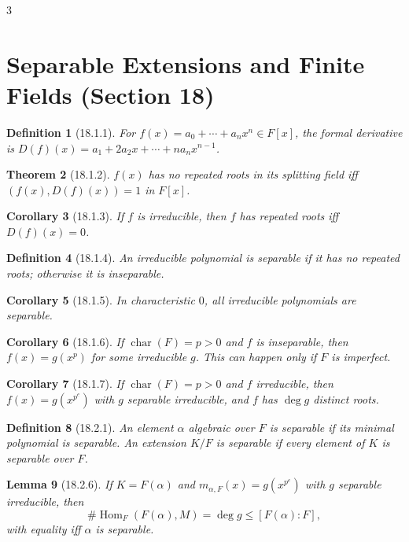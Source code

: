 \documentclass[10pt,landscape]{article}
\newtheorem{theorem}{Theorem}[section]
\newtheorem{definition}[theorem]{Definition}
\newtheorem{lemma}[theorem]{Lemma}
\newtheorem{corollary}[theorem]{Corollary}
\begin{document}
\begin{multicols}{3}
\section{Separable Extensions and Finite Fields (Section 18)}

\begin{definition}[18.1.1]
For $f(x)=a_0+\cdots+a_nx^n\in F[x]$, the formal derivative is $D(f)(x)=a_1+2a_2x+\cdots+na_nx^{n-1}$.
\end{definition}

\begin{theorem}[18.1.2]
$f(x)$ has no repeated roots in its splitting field iff $(f(x),D(f)(x))=1$ in $F[x]$.
\end{theorem}

\begin{corollary}[18.1.3]
If $f$ is irreducible, then $f$ has repeated roots iff $D(f)(x)=0$.
\end{corollary}

\begin{definition}[18.1.4]
An irreducible polynomial is separable if it has no repeated roots; otherwise it is inseparable.
\end{definition}

\begin{corollary}[18.1.5]
In characteristic $0$, all irreducible polynomials are separable.
\end{corollary}

\begin{corollary}[18.1.6]
If $\operatorname{char}(F)=p>0$ and $f$ is inseparable, then $f(x)=g(x^p)$ for some irreducible $g$. This can happen only if $F$ is imperfect.
\end{corollary}

\begin{corollary}[18.1.7]
If $\operatorname{char}(F)=p>0$ and $f$ irreducible, then $f(x)=g(x^{p^e})$ with $g$ separable irreducible, and $f$ has $\deg g$ distinct roots.
\end{corollary}

\begin{definition}[18.2.1]
An element $\alpha$ algebraic over $F$ is separable if its minimal polynomial is separable. An extension $K/F$ is separable if every element of $K$ is separable over $F$.
\end{definition}

\begin{lemma}[18.2.6]
If $K=F(\alpha)$ and $m_{\alpha,F}(x)=g(x^{p^e})$ with $g$ separable irreducible, then
\[
\#\operatorname{Hom}_F(F(\alpha),M) = \deg g \le [F(\alpha):F],
\]
with equality iff $\alpha$ is separable.
\end{lemma}


\end{multicols}
\end{document}
